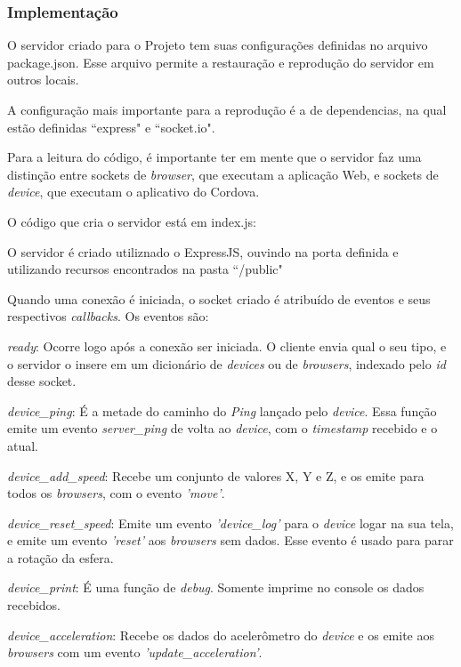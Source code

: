 \documentclass[a4paper,12pt]{article}
\begin{document}
\subsubsection{Implementação}

O servidor criado para o Projeto tem suas configurações definidas no arquivo package.json. Esse arquivo permite a restauração e reprodução do servidor em outros locais.


A configuração mais importante para a reprodução é a de dependencias, na qual estão definidas “express" e “socket.io".

Para a leitura do código, é importante ter em mente que o servidor faz uma distinção entre sockets de \emph{browser}, que executam a aplicação Web, e sockets de \emph{device}, que executam o aplicativo do Cordova.

O código que cria o servidor está em index.js:



O servidor é criado utiliznado o ExpressJS, ouvindo na porta definida e utilizando recursos encontrados na pasta “/public"

Quando uma conexão é iniciada, o socket criado é atribuído de eventos e seus respectivos \emph{callbacks}. Os eventos são:

\emph{ready}: Ocorre logo após a conexão ser iniciada. O cliente envia qual o seu tipo, e o servidor o insere em um dicionário de \emph{devices} ou de \emph{browsers}, indexado pelo \emph{id} desse socket.

\emph{device\_ping}: É a metade do caminho do \emph{Ping} lançado pelo \emph{device}. Essa função emite um evento \emph{server\_ping} de volta ao \emph{device}, com o \emph{timestamp} recebido e o atual.

\emph{device\_add\_speed}: Recebe um conjunto de valores X, Y e Z, e os emite para todos os \emph{browsers}, com o evento \emph{'move'}.

\emph{device\_reset\_speed}: Emite um evento \emph{'device\_log'} para o \emph{device} logar na sua tela, e emite um evento \emph{'reset'} aos \emph{browsers} sem dados. Esse evento é usado para parar a rotação da esfera.

\emph{device\_print}: É uma função de \emph{debug}. Somente imprime no console os dados recebidos.

\emph{device\_acceleration}: Recebe os dados do acelerômetro do \emph{device} e os emite aos \emph{browsers} com um evento \emph{'update\_acceleration'}.
\end{document}
